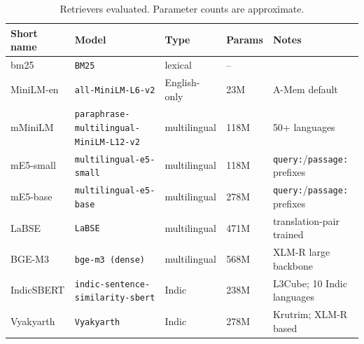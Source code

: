 \begin{table}[t]
\centering
\small
\setlength{\tabcolsep}{4pt}
\caption{Retrievers evaluated. Parameter counts are approximate.}
\label{tab:retrievers}
\begin{tabular}{@{}l l l l l@{}}
\toprule
Short name & Model & Type & Params & Notes \\
\midrule
bm25 & \texttt{BM25} & lexical & -- & \citet{robertson2009bm25} \\
MiniLM-en & \texttt{all-MiniLM-L6-v2} & English-only & 23M & A-Mem default \\
mMiniLM & \texttt{paraphrase-multilingual-MiniLM-L12-v2} & multilingual & 118M & 50+ languages \\
mE5-small & \texttt{multilingual-e5-small} & multilingual & 118M & \texttt{query:}/\texttt{passage:} prefixes \\
mE5-base & \texttt{multilingual-e5-base} & multilingual & 278M & \texttt{query:}/\texttt{passage:} prefixes \\
LaBSE & \texttt{LaBSE} & multilingual & 471M & translation-pair trained \\
BGE-M3 & \texttt{bge-m3 (dense)} & multilingual & 568M & XLM-R large backbone \\
IndicSBERT & \texttt{indic-sentence-similarity-sbert} & Indic & 238M & L3Cube; 10 Indic languages \\
Vyakyarth & \texttt{Vyakyarth} & Indic & 278M & Krutrim; XLM-R based \\
\bottomrule
\end{tabular}
\end{table}
